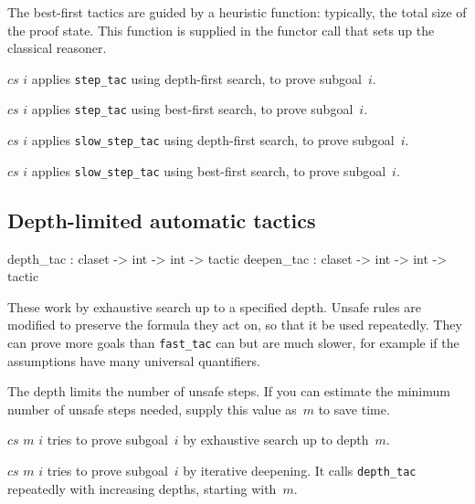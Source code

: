 The best-first tactics are guided by a heuristic function: typically, the
total size of the proof state.  This function is supplied in the functor call
that sets up the classical reasoner.
\begin{ttdescription}
\item[\ttindexbold{fast_tac} $cs$ $i$] applies \texttt{step_tac} using
depth-first search, to prove subgoal~$i$.

\item[\ttindexbold{best_tac} $cs$ $i$] applies \texttt{step_tac} using
best-first search, to prove subgoal~$i$.

\item[\ttindexbold{slow_tac} $cs$ $i$] applies \texttt{slow_step_tac} using
depth-first search, to prove subgoal~$i$.

\item[\ttindexbold{slow_best_tac} $cs$ $i$] applies \texttt{slow_step_tac} using
best-first search, to prove subgoal~$i$.
\end{ttdescription}


\subsection{Depth-limited automatic tactics}
\begin{ttbox} 
depth_tac  : claset -> int -> int -> tactic
deepen_tac : claset -> int -> int -> tactic
\end{ttbox}
These work by exhaustive search up to a specified depth.  Unsafe rules are
modified to preserve the formula they act on, so that it be used repeatedly.
They can prove more goals than \texttt{fast_tac} can but are much
slower, for example if the assumptions have many universal quantifiers.

The depth limits the number of unsafe steps.  If you can estimate the minimum
number of unsafe steps needed, supply this value as~$m$ to save time.
\begin{ttdescription}
\item[\ttindexbold{depth_tac} $cs$ $m$ $i$] 
tries to prove subgoal~$i$ by exhaustive search up to depth~$m$.

\item[\ttindexbold{deepen_tac} $cs$ $m$ $i$] 
tries to prove subgoal~$i$ by iterative deepening.  It calls \texttt{depth_tac}
repeatedly with increasing depths, starting with~$m$.
\end{ttdescription}


